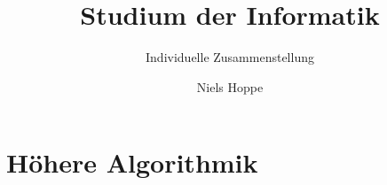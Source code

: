 \documentclass[german]{scrbook}
\title{Studium der Informatik}
\subtitle{Individuelle Zusammenstellung}
\author{Niels Hoppe}
\begin{document}
\maketitle
\tableofcontents

\chapter{Höhere Algorithmik}


{}

\end{document}
